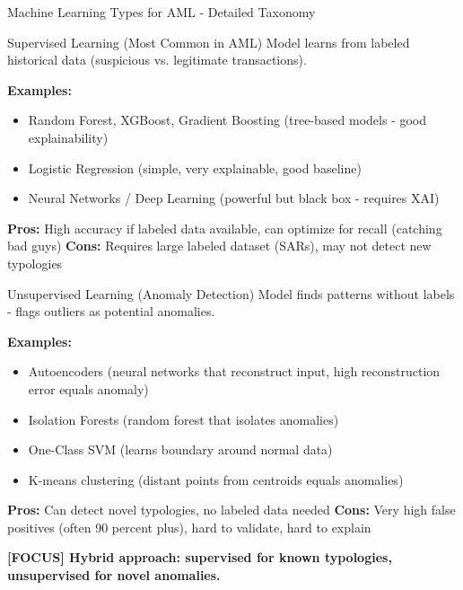 \documentclass[11pt,a4paper]{beamer}
\newcommand{\examfocus}[1]{\textcolor{orange!80!black}{\textbf{[FOCUS] #1}}}
\begin{document}
	\begin{frame}{Machine Learning Types for AML - Detailed Taxonomy}
		\begin{block}{Supervised Learning (Most Common in AML)}
			Model learns from labeled historical data (suspicious vs. legitimate transactions).
		\end{block}
		
		\textbf{Examples:}
		\begin{itemize}
			\item Random Forest, XGBoost, Gradient Boosting (tree-based models - good explainability)
			\item Logistic Regression (simple, very explainable, good baseline)
			\item Neural Networks / Deep Learning (powerful but black box - requires XAI)
		\end{itemize}
		
		\textbf{Pros:} High accuracy if labeled data available, can optimize for recall (catching bad guys)
		\textbf{Cons:} Requires large labeled dataset (SARs), may not detect new typologies
		
		\begin{block}{Unsupervised Learning (Anomaly Detection)}
			Model finds patterns without labels - flags outliers as potential anomalies.
		\end{block}
		
		\textbf{Examples:}
		\begin{itemize}
			\item Autoencoders (neural networks that reconstruct input, high reconstruction error equals anomaly)
			\item Isolation Forests (random forest that isolates anomalies)
			\item One-Class SVM (learns boundary around normal data)
			\item K-means clustering (distant points from centroids equals anomalies)
		\end{itemize}
		
		\textbf{Pros:} Can detect novel typologies, no labeled data needed
		\textbf{Cons:} Very high false positives (often 90 percent plus), hard to validate, hard to explain
		
		\examfocus{Hybrid approach: supervised for known typologies, unsupervised for novel anomalies.}
	\end{frame}
	
\end{document}
